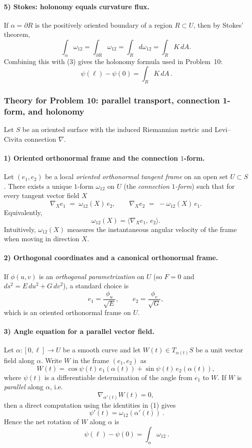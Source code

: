 \documentclass[12pt,a4paper]{article}
\theoremstyle{plain}
\theoremstyle{definition}      %
\begin{document}
\paragraph{5) Stokes: holonomy equals curvature flux.}
If $\alpha=\partial R$ is the positively oriented boundary of a region $R\subset U$, then by Stokes' theorem,
\[
\int_\alpha \omega_{12}=\int_{\partial R}\omega_{12}=\int_R d\omega_{12}
=\int_R K\,dA.
\]
Combining this with (3) gives the holonomy formula used in Problem~10:
\[
\boxed{\,\psi(\ell)-\psi(0)=\int_R K\,dA\,}.
\]
	
	
	
	\subsubsection*{Theory for Problem 10: parallel transport, connection 1-form, and holonomy}
	
	Let $S$ be an oriented surface with the induced Riemannian metric and Levi--Civita connection $\nabla$.
	
	\paragraph{1) Oriented orthonormal frame and the connection $1$-form.}
	Let $(e_1,e_2)$ be a local \emph{oriented orthonormal tangent frame} on an open set $U\subset S$.
	There exists a unique $1$-form $\omega_{12}$ on $U$ (the \emph{connection $1$-form}) such that for every tangent vector field $X$
	\[
	\nabla_X e_1 \;=\; \omega_{12}(X)\,e_2,
	\qquad
	\nabla_X e_2 \;=\; -\omega_{12}(X)\,e_1.
	\]
	Equivalently,
	\[
	\omega_{12}(X)=\langle \nabla_X e_1,\, e_2\rangle.
	\]
	Intuitively, $\omega_{12}(X)$ measures the instantaneous angular velocity of the frame when moving in direction $X$.
	
	\paragraph{2) Orthogonal coordinates and a canonical orthonormal frame.}
	If $\phi(u,v)$ is an \emph{orthogonal parametrization} on $U$ (so $F=0$ and $ds^2=E\,du^2+G\,dv^2$), a standard choice is
	\[
	e_1=\frac{\phi_u}{\sqrt{E}},
	\qquad
	e_2=\frac{\phi_v}{\sqrt{G}},
	\]
	which is an oriented orthonormal frame on $U$.
	
	\paragraph{3) Angle equation for a parallel vector field.}
	Let $\alpha:[0,\ell]\to U$ be a smooth curve and let $W(t)\in T_{\alpha(t)}S$ be a unit vector field along $\alpha$.
	Write $W$ in the frame $(e_1,e_2)$ as
	\[
	W(t)=\cos\psi(t)\,e_1(\alpha(t))+\sin\psi(t)\,e_2(\alpha(t)),
	\]
	where $\psi(t)$ is a differentiable determination of the angle from $e_1$ to $W$.
	If $W$ is \emph{parallel} along $\alpha$, i.e.
	\[
	\nabla_{\alpha'(t)}W(t)=0,
	\]
	then a direct computation using the identities in (1) gives
	\[
	\boxed{\ \psi'(t)=\omega_{12}(\alpha'(t))\ }.
	\]
	Hence the net rotation of $W$ along $\alpha$ is
	\[
	\boxed{\ \psi(\ell)-\psi(0)=\int_\alpha \omega_{12}\ }.
	\]
	
\end{document}
